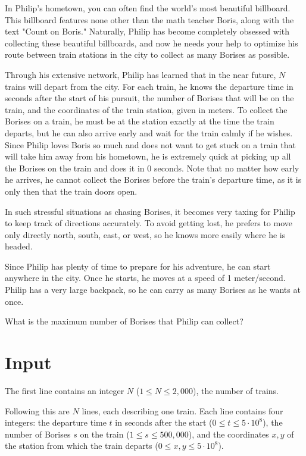 \noindent
In Philip's hometown, you can often find the world's most beautiful billboard. This billboard features none other than the math teacher Boris, along with the text "Count on Boris." Naturally, Philip has become completely obsessed with collecting these beautiful billboards, and now he needs your help to optimize his route between train stations in the city to collect as many Borises as possible.

Through his extensive network, Philip has learned that in the near future, $N$ trains will depart from the city. For each train, he knows the departure time in seconds after the start of his pursuit, the number of Borises that will be on the train, and the coordinates of the train station, given in meters.
To collect the Borises on a train, he must be at the station exactly at the time the train departs, but he can also arrive early and wait for the train calmly if he wishes.
Since Philip loves Boris so much and does not want to get stuck on a train that will take him away from his hometown, he is extremely quick at picking up all the Borises on the train and does it in 0 seconds. Note that no matter how early he arrives, he cannot collect the Borises before the train's departure time, as it is only then that the train doors open.

In such stressful situations as chasing Borises, it becomes very taxing for Philip to keep track of directions accurately. To avoid getting lost, he prefers to move only directly north, south, east, or west, so he knows more easily where he is headed.

Since Philip has plenty of time to prepare for his adventure, he can start anywhere in the city. Once he starts, he moves at a speed of 1 meter/second. Philip has a very large backpack, so he can carry as many Borises as he wants at once.

What is the maximum number of Borises that Philip can collect?

\section*{Input}
The first line contains an integer $N$ ($1 \le N \le 2,000$), the number of trains.

Following this are $N$ lines, each describing one train.
Each line contains four integers: the departure time $t$ in seconds after the start ($0 \le t \le 5 \cdot 10^8$), the number of Borises $s$ on the train ($1 \le s \le 500,000$), and the coordinates $x, y$ of the station from which the train departs ($0 \le x, y \le 5 \cdot 10^8$).

